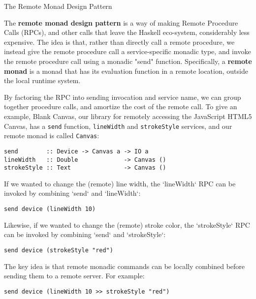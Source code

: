 \begin{hcarentry}[new]{The Remote Monad Design Pattern}
\label{Wakarusa}
\makeheader

The {\bf remote monad design pattern} is a way of
making Remote Procedure Calls (RPCs), and other
calls that leave the Haskell eco-system, considerably less expensive.
The idea is that, rather than directly call a remote procedure,
we instead give the remote procedure call a service-specific monadic
type, and invoke the remote procedure call using a monadic "send" function.
Specifically, a {\bf remote monad} is a monad that has its evaluation function in
a remote location, outside the local runtime system.

By factoring the RPC into sending invocation and service name, we can
group together procedure calls, and amortize the cost of the remote
call. To give an example, Blank Canvas, our library for remotely
accessing the JavaScript HTML5 Canvas, has a \verb|send| function,
\verb`lineWidth` and \verb`strokeStyle` services, and our remote monad is called
\verb`Canvas`:

\begin{verbatim}
send        :: Device -> Canvas a -> IO a
lineWidth   :: Double             -> Canvas ()
strokeStyle :: Text               -> Canvas ()
\end{verbatim}

If we wanted to change the (remote) line width,
the `lineWidth` RPC can be invoked by combining `send`
and `lineWidth`:

\begin{verbatim}
send device (lineWidth 10)
\end{verbatim}

Likewise, if we wanted to change the (remote) stroke color,
the `strokeStyle` RPC can be invoked by combining `send`
and `strokeStyle`:

\begin{verbatim}
send device (strokeStyle "red")
\end{verbatim}

The key idea is that remote monadic commands can
be locally combined before sending them to a remote server.
For example:

\begin{verbatim}
send device (lineWidth 10 >> strokeStyle "red")
\end{verbatim}


\end{hcarentry}
